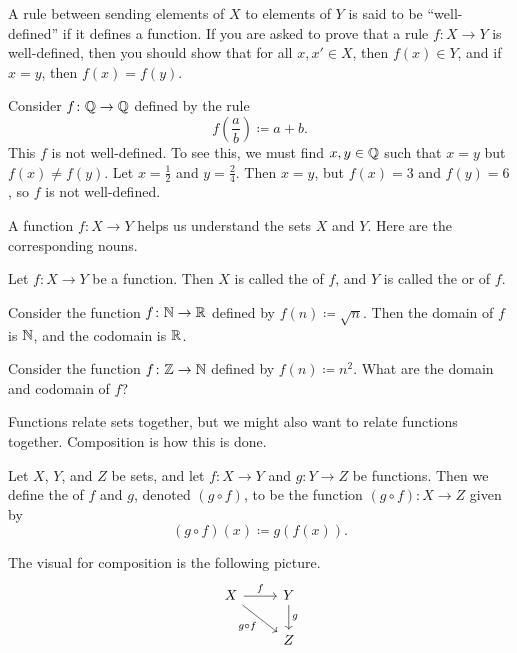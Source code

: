 \documentclass[../notes.tex]{subfiles}
\begin{document}
A rule between sending elements of $X$ to elements of $Y$ is said to be ``well-defined'' if it defines a function. If you are asked to prove that a rule $f\colon X \to Y$ is well-defined, then you should show that for all $x, x' \in X$, then $f(x) \in Y$, and if $x = y$, then $f(x) = f(y)$.
\begin{nex}
    Consider $f\colon \mathbb Q \to \mathbb Q$ defined by the rule
    \[f\left(\frac{a}{b}\right) \coloneqq a + b.\]
    This $f$ is not well-defined. To see this, we must find $x, y \in \mathbb Q$ such that $x = y$ but $f(x) \neq f(y)$. Let $x = \frac{1}{2}$ and $y = \frac{2}{4}$. Then $x = y$, but $f(x) = 3$ and $f(y) = 6$, so $f$ is not well-defined.
\end{nex}
A function $f\colon X\to Y$ helps us understand the sets $X$ and $Y$. Here are the corresponding nouns.
\begin{definition}
    Let $f\colon X\to Y$ be a function. Then $X$ is called the  of $f$, and $Y$ is called the  or  of $f$.
\end{definition}
\begin{example}
    Consider the function $f\colon\mathbb N\to\mathbb R$ defined by $f(n)\coloneqq\sqrt n$. Then the domain of $f$ is $\mathbb N$, and the codomain is $\mathbb R$.
\end{example}
\begin{exe}
    Consider the function $f\colon\mathbb Z\to\mathbb N$ defined by $f(n)\coloneqq n^2$. What are the domain and codomain of $f$?
\end{exe}
Functions relate sets together, but we might also want to relate functions together. Composition is how this is done.
\begin{definition}[composition]
    Let $X$, $Y$, and $Z$ be sets, and let $f\colon X\to Y$ and $g\colon Y\to Z$ be functions. Then we define the  of $f$ and $g$, denoted $(g\circ f)$, to be the function $(g\circ f)\colon X\to Z$ given by
    \[(g\circ f)(x)\coloneqq g(f(x)).\]
\end{definition}
The visual for composition is the following picture.
\[\begin{tikzcd}
	X & Y \\
	& Z
	\arrow["f", from=1-1, to=1-2]
	\arrow["g", from=1-2, to=2-2]
	\arrow["{g\circ f}"', from=1-1, to=2-2]
\end{tikzcd}\]
\end{document}
